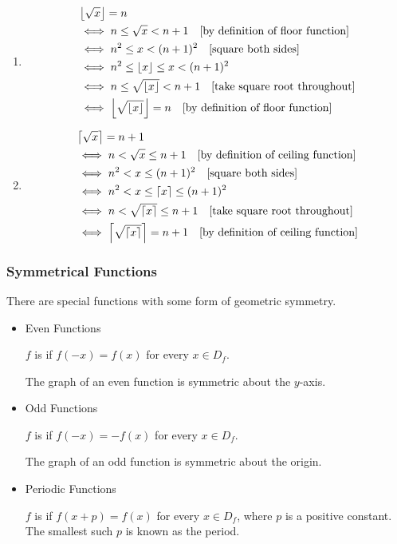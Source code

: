 \begin{solution} \
\begin{enumerate}[label=(\alph*)]
\item \begin{align*}
&\left\lfloor \sqrt{x} \right\rfloor=n \\
&\iff n\le\sqrt{x}<n+1 \quad \text{[by definition of floor function]} \\
&\iff n^2\le x<(n+1)^2 \quad \text{[square both sides]} \\
&\iff n^2\le\left\lfloor x \right\rfloor\le x<(n+1)^2 \\
&\iff n\le\sqrt{\left\lfloor x \right\rfloor}<n+1 \quad \text{[take square root throughout]} \\
&\iff \left\lfloor \sqrt{\left\lfloor x \right\rfloor} \right\rfloor=n \quad \text{[by definition of floor function]}
\end{align*}

\item \begin{align*}
&\left\lceil \sqrt{x} \right\rceil=n+1 \\
&\iff n<\sqrt{x}\le n+1 \quad \text{[by definition of ceiling function]} \\
&\iff n^2<x\le(n+1)^2 \quad \text{[square both sides]} \\
&\iff n^2<x\le\left\lceil x \right\rceil\le(n+1)^2 \\
&\iff n<\sqrt{\left\lceil x \right\rceil}\le n+1 \quad \text{[take square root throughout]} \\
&\iff \left\lceil \sqrt{\left\lceil x \right\rceil} \right\rceil=n+1 \quad \text{[by definition of ceiling function]}
\end{align*}
\end{enumerate}
\end{solution}

\subsubsection{Symmetrical Functions}
There are special functions with some form of geometric symmetry.

\begin{itemize}
\item Even Functions

$f$ is  if $f(-x)=f(x)$ for every $x\in D_f$.

The graph of an even function is symmetric about the $y$-axis.

\item Odd Functions

$f$ is  if $f(-x)=-f(x)$ for every $x\in D_f$.

The graph of an odd function is symmetric about the origin.

\item Periodic Functions

$f$ is  if $f(x+p)=f(x)$ for every $x\in D_f$, where $p$ is a positive constant. The smallest such $p$ is known as the period.
\end{itemize}

